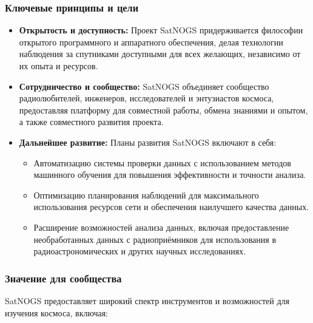 \documentclass[12pt, a4paper]{extreport}
\begin{document}
\subsubsection{Ключевые принципы и цели}

\begin{itemize}
    \item \textbf{Открытость и доступность:} Проект SatNOGS придерживается философии открытого программного и аппаратного обеспечения, делая технологии наблюдения за спутниками доступными для всех желающих, независимо от их опыта и ресурсов.
    \item \textbf{Сотрудничество и сообщество:} SatNOGS объединяет  сообщество радиолюбителей, инженеров, исследователей  и энтузиастов космоса, предоставляя платформу для совместной работы, обмена знаниями и опытом,  а также совместного развития проекта.
    \item \textbf{Дальнейшее развитие:}  Планы  развития SatNOGS включают в себя:
          \begin{itemize}
              \item Автоматизацию системы проверки данных с использованием методов машинного обучения для повышения эффективности и точности анализа.
              \item Оптимизацию планирования наблюдений для  максимального использования ресурсов сети и обеспечения наилучшего качества данных.
              \item Расширение возможностей анализа данных,  включая предоставление необработанных данных с радиоприёмников для использования в радиоастрономических и других научных исследованиях.
          \end{itemize}
\end{itemize}


\subsubsection{Значение для сообщества}

SatNOGS предоставляет  широкий спектр инструментов и возможностей для изучения космоса,  включая:
\end{document}
